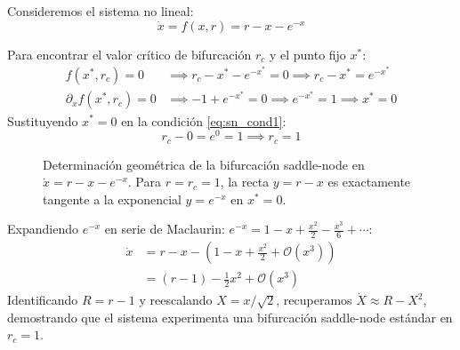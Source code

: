 Consideremos el sistema no lineal:
\begin{equation}
    \dot{x} = f(x, r) = r - x - e^{-x}
    \label{eq:ejemplo_sn_exp}
\end{equation}

Para encontrar el valor crítico de bifurcación $r_c$ y el punto fijo $x^*$:
\begin{align}
    f(x^*, r_c) = 0 &\implies r_c - x^* - e^{-x^*} = 0 \implies r_c - x^* = e^{-x^*} \label{eq:sn_cond1}\\
    \partial_x f(x^*, r_c) = 0 &\implies -1 + e^{-x^*} = 0 \implies e^{-x^*} = 1 \implies x^* = 0 \label{eq:sn_cond2}
\end{align}
Sustituyendo $x^* = 0$ en la condición \eqref{eq:sn_cond1}:
\begin{equation}
    r_c - 0 = e^0 = 1 \implies r_c = 1
\end{equation}

\begin{figure}[htbp]
\centering
{}
\caption{Determinación geométrica de la bifurcación saddle-node en $\dot{x} = r - x - e^{-x}$. Para $r = r_c = 1$, la recta $y = r-x$ es exactamente tangente a la exponencial $y = e^{-x}$ en $x^* = 0$.}
\label{fig:ejemplo_transcendente_saddlenode}
\end{figure}

Expandiendo $e^{-x}$ en serie de Maclaurin: $e^{-x} = 1 - x + \frac{x^2}{2} - \frac{x^3}{6} + \cdots$:
\begin{align}
    \dot{x} &= r - x - \left(1 - x + \frac{x^2}{2} + \mathcal{O}(x^3)\right) \nonumber \\
    &= (r - 1) - \frac{1}{2}x^2 + \mathcal{O}(x^3)
\end{align}
Identificando $R = r - 1$ y reescalando $X = x/\sqrt{2}$, recuperamos $\dot{X} \approx R - X^2$, demostrando que el sistema experimenta una bifurcación saddle-node estándar en $r_c = 1$.

